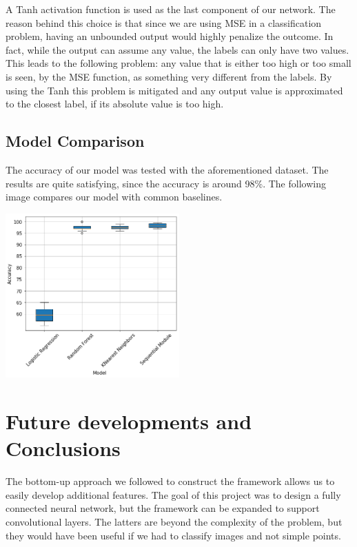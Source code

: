 \documentclass[10pt,conference,compsocconf]{IEEEtran}
\begin{document}
A Tanh activation function is used as the last component of our network. The reason behind this choice is that since we are using MSE in a classification problem, having an unbounded output would highly penalize the outcome. In fact, while the output can assume any value, the labels can only have two values. This leads to the following problem: any value that is either too high or too small is seen, by the MSE function, as something very different from the labels. 
By using the Tanh this problem is mitigated and any output value is approximated to the closest label, if its absolute value is too high.

\subsection{Model Comparison}
The accuracy of our model was tested with the aforementioned dataset. The results are quite satisfying, since the accuracy is around 98\%.
The following image compares our model with common baselines.

\begin{center}
	\captionsetup{type=figure}
	\includegraphics[width=0.5\textwidth]{img/boxplots_final.png}
	\label{fig:boxplot}
\end{center} 

\section{Future developments and Conclusions}
The bottom-up approach we followed to construct the framework allows us to easily develop additional features. The goal of this project was to design a fully connected neural network, but the framework can be expanded to support convolutional layers. The latters are beyond the complexity of the problem, but they would have been useful if we had to classify images and not simple points.
\end{document}
